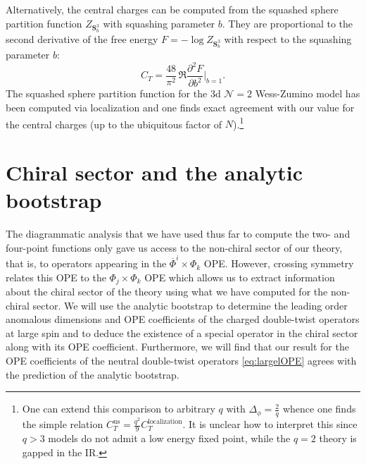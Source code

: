 \documentclass[11pt]{article}
\newcommand{\Phib}{\overline{\Phi}}
\begin{document}
Alternatively, the central charges can be computed from the squashed sphere partition function $Z_{\mathbf{S}_{b}^{3}}$ with squashing parameter $b$. They are proportional to the second derivative of the free energy $F = -\log Z_{\mathbf{S}_{b}^{3}}$ with respect to the squashing parameter $b$:
%
\begin{equation}\label{eqn:tauRR}
C_{T} = \frac{48}{\pi^2}\, \Re\frac{\partial^2 F}{\partial b^2}\bigg|_{b=1}.
\end{equation}	
%
The squashed sphere partition function for the 3d $\mathcal{N}=2$ Wess-Zumino model has been computed via localization \cite{Nishioka:2013gza,Gang:2019jut} and one finds exact agreement with our value for the central charges (up to the ubiquitous factor of $N$).\footnote{One can extend this comparison to arbitrary $q$ with $\Delta_{\phi} = \frac{2}{q}$ whence one finds the simple relation $C_{T}^{\mathrm{us}} = \frac{q^{2}}{9}C_{T}^{\mathrm{localization}}$. It is unclear how to interpret this since $q > 3$ models do not admit a low energy fixed point, while the $q=2$ theory is gapped in the IR.}

\section{Chiral sector and the analytic bootstrap}
\label{sec:chiral}

The diagrammatic analysis that we have used thus far to compute the two- and four-point functions only gave us access to the non-chiral sector of our theory, that is, to operators appearing in the $\Phib^i \times \Phi_k$ OPE. However, crossing symmetry relates this OPE to the $\Phi_j \times \Phi_k$ OPE which allows us to extract information about the chiral sector of the theory using what we have computed for the non-chiral sector. We will use the analytic bootstrap to determine the leading order anomalous dimensions and OPE coefficients of the charged double-twist operators at large spin and to deduce the existence of a special operator in the chiral sector along with its OPE coefficient. Furthermore, we will find that our result for the OPE coefficients of the neutral double-twist operators \eqref{eq:largelOPE} agrees with the prediction of the analytic bootstrap.
\end{document}
